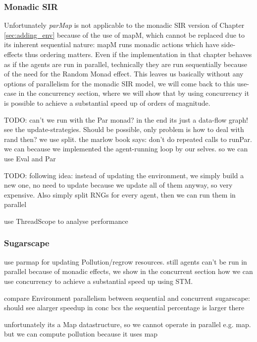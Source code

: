 \subsubsection{Monadic SIR}
Unfortunately \textit{parMap} is not applicable to the monadic SIR version of Chapter \ref{sec:adding_env} because of the use of mapM, which cannot be replaced due to its inherent sequential nature: mapM runs monadic actions which have side-effects thus ordering matters. Even if the implementation in that chapter behaves as if the agents are run in parallel, technically they are run sequentially because of the need for the Random Monad effect. This leaves us basically without any options of parallelism for the monadic SIR model, we will come back to this use-case in the concurrency section, where we will show that by using concurrency it is possible to achieve a substantial speed up of orders of magnitude.

TODO: can't we run with the Par monad? in the end its just a data-flow graph! see the update-strategies. Should be possible, only problem is how to deal with rand then? we use split. the marlow book says: don't do repeated calls to runPar. we can because we implemented the agent-running loop  by our selves. so we can use Eval and Par

TODO: following idea: instead of updating the environment, we simply build a new one, no need to update because we update all of them anyway, so very expensive. Also simply split RNGs for every agent, then we can run them in parallel 

use ThreadScope to analyse performance


\subsubsection{Sugarscape}
use parmap for updating Pollution/regrow resources. still agents can't be run in parallel because of monadic effects, we show in the concurrent section how we can use concurrency to achieve a substantial speed up using STM.

compare Environment parallelism between sequential and concurrent sugarscape: should see alarger speedup in conc bcs the sequential percentage is larger there

unfortunately its a Map datastructure, so we cannot operate in parallel e.g. map. but we can compute pollution because it uses map



